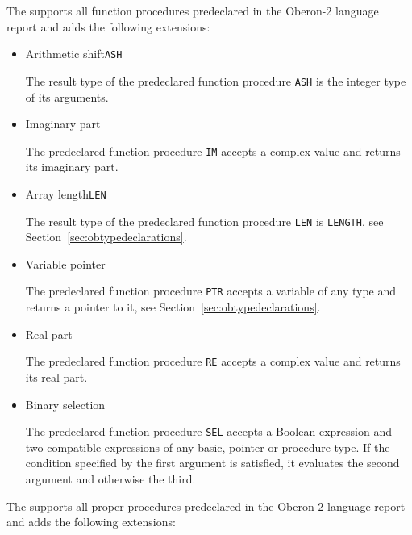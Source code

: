 \label{sec:obpredeclaredprocedures}

The \ecs{} supports all function procedures predeclared in the Oberon-2 language report and adds the following extensions:

\begin{itemize}

\item Arithmetic shift\alignright\texttt{ASH}\nopagebreak

The result type of the predeclared function procedure \texttt{ASH} is the integer type of its arguments.

\item Imaginary part\alignright{}\nopagebreak

The predeclared function procedure \texttt{IM} accepts a complex value and returns its imaginary part.

\item Array length\alignright\texttt{LEN}\nopagebreak

The result type of the predeclared function procedure \texttt{LEN} is \texttt{LENGTH}, see Section~\ref{sec:obtypedeclarations}.

\item Variable pointer\alignright{}\nopagebreak

The predeclared function procedure \texttt{PTR} accepts a variable of any type and returns a pointer to it, see Section~\ref{sec:obtypedeclarations}.

\item Real part\alignright{}\nopagebreak

The predeclared function procedure \texttt{RE} accepts a complex value and returns its real part.

\item Binary selection\alignright\texttt{}\nopagebreak

The predeclared function procedure \texttt{SEL} accepts a Boolean expression and two compatible expressions of any basic, pointer or procedure type.
If the condition specified by the first argument is satisfied, it evaluates the second argument and otherwise the third.

\end{itemize}

The \ecs{} supports all proper procedures predeclared in the Oberon-2 language report and adds the following extensions:

